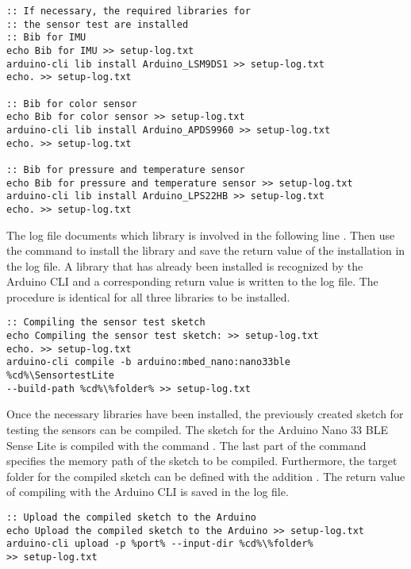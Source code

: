 \begin{lstlisting}
:: If necessary, the required libraries for 
:: the sensor test are installed
:: Bib for IMU
echo Bib for IMU >> setup-log.txt
arduino-cli lib install Arduino_LSM9DS1 >> setup-log.txt
echo. >> setup-log.txt
    
:: Bib for color sensor
echo Bib for color sensor >> setup-log.txt
arduino-cli lib install Arduino_APDS9960 >> setup-log.txt
echo. >> setup-log.txt
    
:: Bib for pressure and temperature sensor
echo Bib for pressure and temperature sensor >> setup-log.txt
arduino-cli lib install Arduino_LPS22HB >> setup-log.txt
echo. >> setup-log.txt
\end{lstlisting}

The log file documents which library is involved in the following line . Then use the command  to install the library and save the return value of the installation in the log file. A library that has already been installed is recognized by the Arduino CLI and a corresponding return value is written to the log file. The procedure is identical for all three libraries to be installed.

\begin{lstlisting}
:: Compiling the sensor test sketch
echo Compiling the sensor test sketch: >> setup-log.txt
echo. >> setup-log.txt
arduino-cli compile -b arduino:mbed_nano:nano33ble 
%cd%\SensortestLite 
--build-path %cd%\%folder% >> setup-log.txt
\end{lstlisting}

Once the necessary libraries have been installed, the previously created sketch for testing the sensors can be compiled. The sketch for the Arduino Nano 33 BLE Sense Lite is compiled with the command . The last part of the command specifies the memory path of the sketch to be compiled. Furthermore, the target folder for the compiled sketch can be defined with the addition . The return value of compiling with the Arduino CLI is saved in the log file.

\begin{lstlisting}
:: Upload the compiled sketch to the Arduino
echo Upload the compiled sketch to the Arduino >> setup-log.txt
arduino-cli upload -p %port% --input-dir %cd%\%folder% 
>> setup-log.txt
\end{lstlisting}

